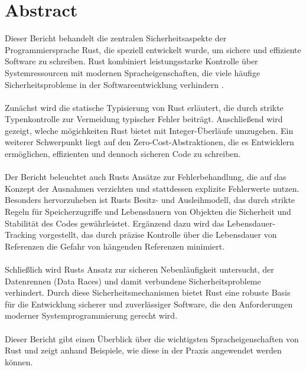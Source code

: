 \section*{Abstract}
\label{sec:abstract}


Dieser Bericht behandelt die zentralen Sicherheitsaspekte der Programmiersprache Rust, die speziell entwickelt wurde, um sichere und effiziente Software zu schreiben. 
Rust kombiniert leistungsstarke Kontrolle über Systemressourcen mit modernen Spracheigenschaften, die viele häufige Sicherheitsprobleme in der Softwareentwicklung verhindern \cite{RustDoc2024}.\\
\\
Zunächst wird die statische Typisierung von Rust erläutert, die durch strikte Typenkontrolle zur Vermeidung typischer Fehler beiträgt. 
Anschließend wird gezeigt, wleche mögichkeiten Rust bietet mit Integer-Überläufe umzugehen. 
Ein weiterer Schwerpunkt liegt auf den Zero-Cost-Abstraktionen, die es Entwicklern ermöglichen, effizienten und dennoch sicheren Code zu schreiben.\\
\\
Der Bericht beleuchtet auch Rusts Ansätze zur Fehlerbehandlung, die auf das Konzept der Ausnahmen verzichten und stattdessen explizite Fehlerwerte nutzen. 
Besonders hervorzuheben ist Rusts Besitz- und Ausleihmodell, das durch strikte Regeln für Speicherzugriffe und Lebensdauern von Objekten die Sicherheit und Stabilität des Codes gewährleistet. 
Ergänzend dazu wird das Lebensdauer-Tracking vorgestellt, das durch präzise Kontrolle über die Lebensdauer von Referenzen die Gefahr von hängenden Referenzen minimiert.\\
\\
Schließlich wird Rusts Ansatz zur sicheren Nebenläufigkeit untersucht, der Datenrennen (Data Races) und damit verbundene Sicherheitsprobleme verhindert. 
Durch diese Sicherheitsmechanismen bietet Rust eine robuste Basis für die Entwicklung sicherer und zuverlässiger Software, die den Anforderungen moderner Systemprogrammierung gerecht wird.\\
\\
Dieser Bericht gibt einen Überblick über die wichtigsten Spracheigenschaften von Rust und zeigt anhand Beispiele, wie diese in der Praxis angewendet werden können.
